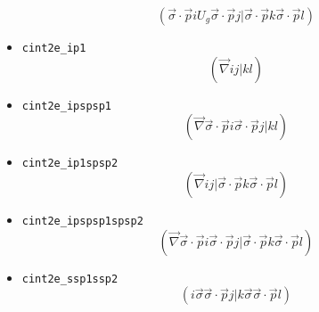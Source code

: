 \documentclass{article}
\begin{document}
\begin{itemize}
  \[(\vec{\sigma}\cdot\vec{p} i U_g \vec{\sigma}\cdot\vec{p} j| \vec{\sigma}\cdot\vec{p} k \vec{\sigma}\cdot\vec{p}l)\]
\item
  \verb!cint2e_ip1! \[(\vec{\nabla} i j| kl)\]
\item
  \verb!cint2e_ipspsp1!
  \[(\vec{\nabla} \vec{\sigma}\cdot\vec{p} i \vec{\sigma}\cdot\vec{p} j| kl)\]
\item
  \verb!cint2e_ip1spsp2!
  \[(\vec{\nabla} i j| \vec{\sigma}\cdot\vec{p} k \vec{\sigma}\cdot\vec{p}l)\]
\item
  \verb!cint2e_ipspsp1spsp2!
  \[(\vec{\nabla} \vec{\sigma}\cdot\vec{p} i \vec{\sigma}\cdot\vec{p} j| \vec{\sigma}\cdot\vec{p} k \vec{\sigma}\cdot\vec{p}l)\]
\item
  \verb!cint2e_ssp1ssp2!
  \[( i \vec{\sigma}\vec{\sigma}\cdot\vec{p} j|k \vec{\sigma}\vec{\sigma}\cdot\vec{p}l)\]

\end{itemize}
\end{document}

